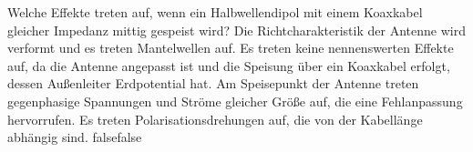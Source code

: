     {Welche Effekte treten auf, wenn ein Halbwellendipol mit einem Koaxkabel gleicher Impedanz mittig gespeist wird?}
    {Die Richtcharakteristik der Antenne wird verformt und es treten Mantelwellen auf.}
    {Es treten keine nennenswerten Effekte auf, da die Antenne angepasst ist und die Speisung über ein Koaxkabel erfolgt, dessen Außenleiter Erdpotential hat.}
    {Am Speisepunkt der Antenne treten gegenphasige Spannungen und Ströme gleicher Größe auf, die eine Fehlanpassung hervorrufen.}
    {Es treten Polarisationsdrehungen auf, die von der Kabellänge abhängig sind.}
    {false}{false}